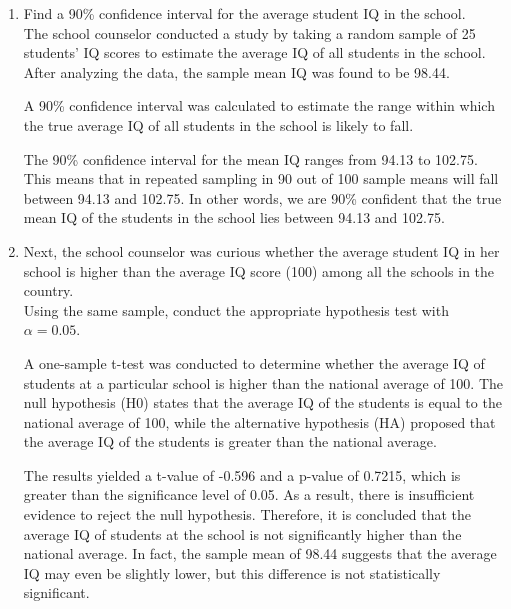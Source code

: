 \documentclass[12pt,letterpaper]{article}
\begin{document}
\begin{enumerate}
	\item Find a 90\% confidence interval for the average student IQ in the school.\\
 

The school counselor conducted a study by taking a random sample of 25 students' IQ scores to estimate the average IQ of all students in the school. After analyzing the data, the sample mean IQ was found to be 98.44.

A 90\% confidence interval was calculated to estimate the range within which the true average IQ of all students in the school is likely to fall.

The 90\% confidence interval for the mean IQ ranges from 94.13 to 102.75. This means that in repeated sampling in 90 out of 100 sample means will fall between 94.13 and 102.75. In other words, we are 90\% confident that the true mean IQ of the students in the school lies between 94.13 and 102.75.\\
	
	\item Next, the school counselor was curious  whether  the average student IQ in her school is higher than the average IQ score (100) among all the schools in the country.\\ 
	
	\noindent Using the same sample, conduct the appropriate hypothesis test with $\alpha=0.05$.
  
A one-sample t-test was conducted to determine whether the average IQ of students at a particular school is higher than the national average of 100. The null hypothesis (H0) states that the average IQ of the students is equal to the national average of 100, while the alternative hypothesis (HA) proposed that the average IQ of the students is greater than the national average.

The results yielded a t-value of -0.596 and a p-value of 0.7215, which is greater than the significance level of 0.05. As a result, there is insufficient evidence to reject the null hypothesis. Therefore, it is concluded that the average IQ of students at the school is not significantly higher than the national average. In fact, the sample mean of 98.44 suggests that the average IQ may even be slightly lower, but this difference is not statistically significant.

\end{enumerate}
\end{document}
